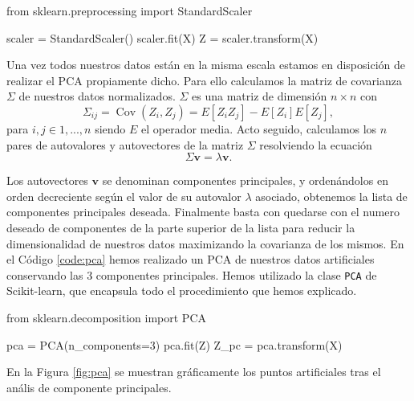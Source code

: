 \begin{mypython}[float={h}, caption={Escalar y estandarizar los datos.}, label={code:standar}]
  from sklearn.preprocessing import StandardScaler

  scaler = StandardScaler()
  scaler.fit(X)
  Z = scaler.transform(X)
\end{mypython}

Una vez todos nuestros datos están en la misma escala estamos en disposición de realizar el PCA propiamente dicho. Para ello calculamos la matriz de covarianza $ \Sigma $ de nuestros datos normalizados. $ \Sigma $ es una matriz de dimensión $ n \times n $ con
\begin{equation}
  \Sigma_{ij} = \operatorname{Cov}(Z_{i},Z_{j}) = E[Z_{i}Z_{j}] - E[Z_{i}] E[Z_{j}],
\end{equation}
para $ i, j \in {1, ..., n} $ siendo $ E $ el operador media. Acto seguido, calculamos los $ n $ pares de autovalores y autovectores de la matriz $ \Sigma $ resolviendo la ecuación
\begin{equation}
  \Sigma \textbf{v} = \lambda \textbf{v}.
\end{equation}

Los autovectores $ \textbf{v} $ se denominan componentes principales, y ordenándolos en orden decreciente según el valor de su autovalor $ \lambda $ asociado, obtenemos la lista de componentes principales deseada. Finalmente basta con quedarse con el numero deseado de componentes de la parte superior de la lista para reducir la dimensionalidad de nuestros datos maximizando la covarianza de los mismos. En el Código \ref{code:pca} hemos realizado un PCA de nuestros datos artificiales conservando las 3 componentes principales. Hemos utilizado la clase \texttt{PCA} de Scikit-learn, que encapsula todo el procedimiento que hemos explicado.

\begin{mypython}[float={h}, caption={Realizar un PCA.}, label={code:pca}]
  from sklearn.decomposition import PCA

  pca = PCA(n_components=3)
  pca.fit(Z)
  Z_pc = pca.transform(X)
\end{mypython}

En la Figura \ref{fig:pca} se muestran gráficamente los puntos artificiales tras el anális de componente principales.

